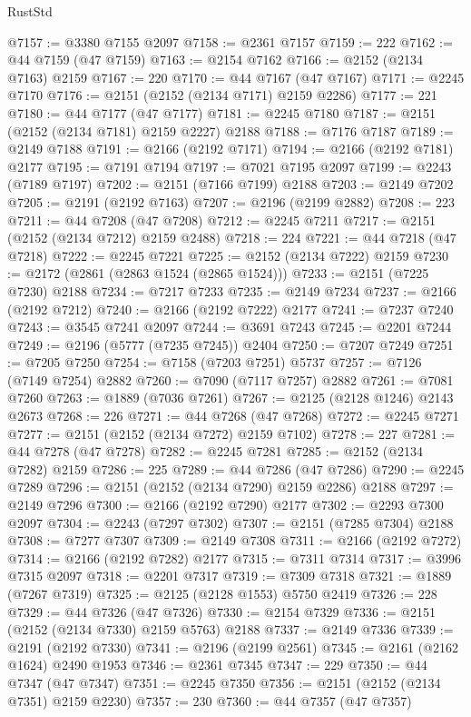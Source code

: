 \begin{lexlean}{RustStd}
\begin{coremodule}
@7157 := @3380 @7155 @2097
@7158 := @2361 @7157
@7159 := 222
@7162 := @44 @7159 (@47 @7159)
@7163 := @2154 @7162
@7166 := @2152 (@2134 @7163) @2159
@7167 := 220
@7170 := @44 @7167 (@47 @7167)
@7171 := @2245 @7170
@7176 := @2151 (@2152 (@2134 @7171) @2159 @2286)
@7177 := 221
@7180 := @44 @7177 (@47 @7177)
@7181 := @2245 @7180
@7187 := @2151 (@2152 (@2134 @7181) @2159 @2227) @2188
@7188 := @7176 @7187
@7189 := @2149 @7188
@7191 := @2166 (@2192 @7171)
@7194 := @2166 (@2192 @7181) @2177
@7195 := @7191 @7194
@7197 := @7021 @7195 @2097
@7199 := @2243 (@7189 @7197)
@7202 := @2151 (@7166 @7199) @2188
@7203 := @2149 @7202
@7205 := @2191 (@2192 @7163)
@7207 := @2196 (@2199 @2882)
@7208 := 223
@7211 := @44 @7208 (@47 @7208)
@7212 := @2245 @7211
@7217 := @2151 (@2152 (@2134 @7212) @2159 @2488)
@7218 := 224
@7221 := @44 @7218 (@47 @7218)
@7222 := @2245 @7221
@7225 := @2152 (@2134 @7222) @2159
@7230 := @2172 (@2861 (@2863 @1524 (@2865 @1524)))
@7233 := @2151 (@7225 @7230) @2188
@7234 := @7217 @7233
@7235 := @2149 @7234
@7237 := @2166 (@2192 @7212)
@7240 := @2166 (@2192 @7222) @2177
@7241 := @7237 @7240
@7243 := @3545 @7241 @2097
@7244 := @3691 @7243
@7245 := @2201 @7244
@7249 := @2196 (@5777 (@7235 @7245)) @2404
@7250 := @7207 @7249
@7251 := @7205 @7250
@7254 := @7158 (@7203 @7251) @5737
@7257 := @7126 (@7149 @7254) @2882
@7260 := @7090 (@7117 @7257) @2882
@7261 := @7081 @7260
@7263 := @1889 (@7036 @7261)
@7267 := @2125 (@2128 @1246) @2143 @2673
@7268 := 226
@7271 := @44 @7268 (@47 @7268)
@7272 := @2245 @7271
@7277 := @2151 (@2152 (@2134 @7272) @2159 @7102)
@7278 := 227
@7281 := @44 @7278 (@47 @7278)
@7282 := @2245 @7281
@7285 := @2152 (@2134 @7282) @2159
@7286 := 225
@7289 := @44 @7286 (@47 @7286)
@7290 := @2245 @7289
@7296 := @2151 (@2152 (@2134 @7290) @2159 @2286) @2188
@7297 := @2149 @7296
@7300 := @2166 (@2192 @7290) @2177
@7302 := @2293 @7300 @2097
@7304 := @2243 (@7297 @7302)
@7307 := @2151 (@7285 @7304) @2188
@7308 := @7277 @7307
@7309 := @2149 @7308
@7311 := @2166 (@2192 @7272)
@7314 := @2166 (@2192 @7282) @2177
@7315 := @7311 @7314
@7317 := @3996 @7315 @2097
@7318 := @2201 @7317
@7319 := @7309 @7318
@7321 := @1889 (@7267 @7319)
@7325 := @2125 (@2128 @1553) @5750 @2419
@7326 := 228
@7329 := @44 @7326 (@47 @7326)
@7330 := @2154 @7329
@7336 := @2151 (@2152 (@2134 @7330) @2159 @5763) @2188
@7337 := @2149 @7336
@7339 := @2191 (@2192 @7330)
@7341 := @2196 (@2199 @2561)
@7345 := @2161 (@2162 @1624) @2490 @1953
@7346 := @2361 @7345
@7347 := 229
@7350 := @44 @7347 (@47 @7347)
@7351 := @2245 @7350
@7356 := @2151 (@2152 (@2134 @7351) @2159 @2230)
@7357 := 230
@7360 := @44 @7357 (@47 @7357)

\end{coremodule}
\end{lexlean}

